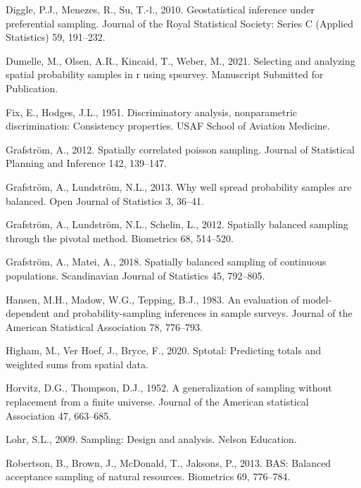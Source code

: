\documentclass[]{elsarticle} %
\begin{document}
\leavevmode\hypertarget{ref-diggle2010geostatistical}{}%
Diggle, P.J., Menezes, R., Su, T.-l., 2010. Geostatistical inference
under preferential sampling. Journal of the Royal Statistical Society:
Series C (Applied Statistics) 59, 191--232.

\leavevmode\hypertarget{ref-dumelle2021spsurvey}{}%
Dumelle, M., Olsen, A.R., Kincaid, T., Weber, M., 2021. Selecting and
analyzing spatial probability samples in r using spsurvey. Manuscript
Submitted for Publication.

\leavevmode\hypertarget{ref-fix1951discriminatory}{}%
Fix, E., Hodges, J.L., 1951. Discriminatory analysis, nonparametric
discrimination: Consistency properties. USAF School of Aviation
Medicine.

\leavevmode\hypertarget{ref-grafstrom2012spatiallypoisson}{}%
Grafström, A., 2012. Spatially correlated poisson sampling. Journal of
Statistical Planning and Inference 142, 139--147.

\leavevmode\hypertarget{ref-grafstrom2013well}{}%
Grafström, A., Lundström, N.L., 2013. Why well spread probability
samples are balanced. Open Journal of Statistics 3, 36--41.

\leavevmode\hypertarget{ref-grafstrom2012spatially}{}%
Grafström, A., Lundström, N.L., Schelin, L., 2012. Spatially balanced
sampling through the pivotal method. Biometrics 68, 514--520.

\leavevmode\hypertarget{ref-grafstrom2018spatially}{}%
Grafström, A., Matei, A., 2018. Spatially balanced sampling of
continuous populations. Scandinavian Journal of Statistics 45, 792--805.

\leavevmode\hypertarget{ref-hansen1983evaluation}{}%
Hansen, M.H., Madow, W.G., Tepping, B.J., 1983. An evaluation of
model-dependent and probability-sampling inferences in sample surveys.
Journal of the American Statistical Association 78, 776--793.

\leavevmode\hypertarget{ref-higham2020sptotal}{}%
Higham, M., Ver Hoef, J., Bryce, F., 2020. Sptotal: Predicting totals
and weighted sums from spatial data.

\leavevmode\hypertarget{ref-horvitz1952generalization}{}%
Horvitz, D.G., Thompson, D.J., 1952. A generalization of sampling
without replacement from a finite universe. Journal of the American
statistical Association 47, 663--685.

\leavevmode\hypertarget{ref-lohr2009sampling}{}%
Lohr, S.L., 2009. Sampling: Design and analysis. Nelson Education.

\leavevmode\hypertarget{ref-robertson2013bas}{}%
Robertson, B., Brown, J., McDonald, T., Jaksons, P., 2013. BAS: Balanced
acceptance sampling of natural resources. Biometrics 69, 776--784.
\end{document}
